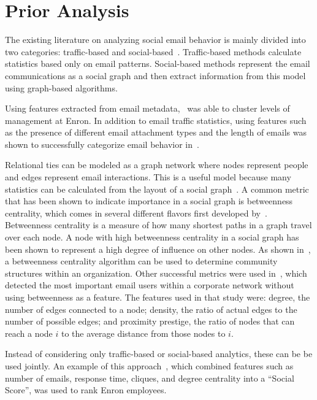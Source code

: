 \documentclass[12pt]{report}
\begin{document}
\section{Prior Analysis}
The existing literature on analyzing social email behavior is mainly divided into two categories: traffic-based and social-based~\cite{tang_email_2013}.
Traffic-based methods calculate statistics based only on email patterns.
Social-based methods represent the email communications as a social graph and then extract information from this model using graph-based algorithms.

Using features extracted from email metadata,~\cite{yelupula_social_2008} was able to cluster levels of management at Enron.
In addition to email traffic statistics, using features such as the presence of different email attachment types and the length of emails was shown to successfully categorize email behavior in~\cite{martin_analyzing_2005}.

Relational ties can be modeled as a graph network where nodes represent people and edges represent email interactions.
This is a useful model because many statistics can be calculated from the layout of a social graph~\cite{wasserman_social_1994}.
A common metric that has been shown to indicate importance in a social graph is betweenness centrality, which comes in several different flavors first developed by~\cite{freeman_set_1977}.
Betweenness centrality is a measure of how many shortest paths in a graph travel over each node.
A node with high betweenness centrality in a social graph has been shown to represent a high degree of influence on other nodes.
As shown in~\cite{tyler_email_2003}, a betweenness centrality algorithm can be used to determine community structures within an organization.
Other successful metrics were used in~\cite{wilson_discovery_2009}, which detected the most important email users within a corporate network without using betweenness as a feature.
The features used in that study were: degree, the number of edges connected to a node; density, the ratio of actual edges to the number of possible edges; and proximity prestige, the ratio of nodes that can reach a node $i$ to the average distance from those nodes to $i$.

Instead of considering only traffic-based or social-based analytics, these can be be used jointly.
An example of this approach~\cite{rowe_automated_2007}, which combined features such as number of emails, response time, cliques, and degree centrality into a ``Social Score'', was used to rank Enron employees.  
\end{document}
